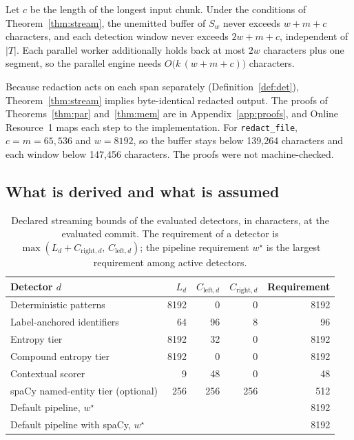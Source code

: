 \documentclass[pdflatex,sn-mathphys-num]{sn-jnl}
\theoremstyle{\ssThmStyle}
\theoremstyle{\ssDefStyle}
\begin{document}
\begin{theorem}\label{thm:mem}
Let $c$ be the length of the longest input chunk. Under the conditions of Theorem~\ref{thm:stream}, the unemitted buffer of $S_w$ never exceeds $w + m + c$ characters, and each detection window never exceeds $2w + m + c$, independent of $|T|$. Each parallel worker additionally holds back at most $2w$ characters plus one segment, so the parallel engine needs $O\bigl(k\,(w + m + c)\bigr)$ characters.
\end{theorem}

Because redaction acts on each span separately (Definition~\ref{def:det}), Theorem~\ref{thm:stream} implies byte-identical redacted output. The proofs of Theorems~\ref{thm:par} and~\ref{thm:mem} are in Appendix~\ref{app:proofs}, and Online Resource~1 maps each step to the implementation. For \texttt{redact\_file}, $c = m = 65{,}536$ and $w = 8192$, so the buffer stays below 139,264 characters and each window below 147,456 characters. The proofs were not machine-checked.

\subsection{What is derived and what is assumed}\label{sec:derived}

\begin{table}[t]
\caption{Declared streaming bounds of the evaluated detectors, in characters, at the evaluated commit. The requirement of a detector is $\max(L_d + C_{\mathrm{right},d},\, C_{\mathrm{left},d})$; the pipeline requirement $w^{\star}$ is the largest requirement among active detectors.}\label{tab:bounds}
\footnotesize
\begin{tabular*}{\textwidth}{@{\extracolsep\fill}lrrrr}
\toprule
Detector $d$ & $L_d$ & $C_{\mathrm{left},d}$ & $C_{\mathrm{right},d}$ & Requirement \\
\midrule
Deterministic patterns & 8192 & 0 & 0 & 8192 \\
Label-anchored identifiers & 64 & 96 & 8 & 96 \\
Entropy tier & 8192 & 32 & 0 & 8192 \\
Compound entropy tier & 8192 & 0 & 0 & 8192 \\
Contextual scorer & 9 & 48 & 0 & 48 \\
spaCy named-entity tier (optional) & 256 & 256 & 256 & 512 \\
\midrule
Default pipeline, $w^{\star}$ & & & & 8192 \\
Default pipeline with spaCy, $w^{\star}$ & & & & 8192 \\
\bottomrule
\end{tabular*}
\end{table}
\end{document}
